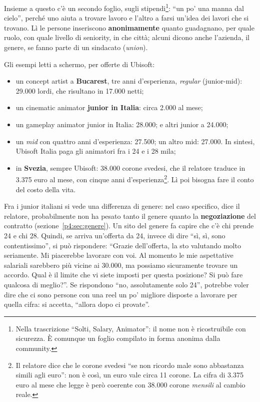 Insieme a questo c'è un secondo foglio, sugli stipendi\footnote{Nella
trascrizione ``Solti, Salary, Animator'': il nome non è ricostruibile con
sicurezza. È comunque un foglio compilato in forma anonima dalla community.}:
``un po' una manna dal cielo'', perché uno aiuta a trovare lavoro e l'altro a
farsi un'idea dei lavori che si trovano. Lì le persone inseriscono
\textbf{anonimamente} quanto guadagnano, per quale ruolo, con quale livello di
seniority, in che città; alcuni dicono anche l'azienda, il genere, se fanno
parte di un sindacato (\emph{union}).

Gli esempi letti a schermo, per offerte di Ubisoft:
\begin{itemize}
  \item un concept artist a \textbf{Bucarest}, tre anni d'esperienza,
        \emph{regular} (junior-mid): 29.000 lordi, che risultano in 17.000
        netti;
  \item un cinematic animator \textbf{junior in Italia}: circa 2.000 al
        mese;
  \item un gameplay animator junior in Italia: 28.000; e altri junior a
        24.000;
  \item un \emph{mid} con quattro anni d'esperienza: 27.500; un altro mid:
        27.000. In sintesi, Ubisoft Italia paga gli animatori fra i 24 e i
        28 mila;
  \item in \textbf{Svezia}, sempre Ubisoft: 38.000 corone svedesi, che il
        relatore traduce in 3.375 euro al mese, con cinque anni
        d'esperienza\footnote{Il relatore dice che le corone svedesi ``se non
        ricordo male sono abbastanza simili agli euro'': non è così, un euro
        vale circa 11 corone. La cifra di 3.375 euro al mese che legge è però
        coerente con 38.000 corone \emph{mensili} al cambio reale.}. Lì poi
        bisogna fare il conto del costo della vita.
\end{itemize}

Fra i junior italiani si vede una differenza di genere: nel caso specifico,
dice il relatore, probabilmente non ha pesato tanto il genere quanto la
\textbf{negoziazione} del contratto (sezione~\ref{p4:sec:genere}). Un sito del
genere fa capire che c'è chi prende 24 e chi 28. Quindi, se arriva un'offerta
da 24, invece di dire ``sì, sì, sono contentissimo'', si può rispondere:
``Grazie dell'offerta, la sto valutando molto seriamente. Mi piacerebbe
lavorare con voi. Al momento le mie aspettative salariali sarebbero più
vicine ai 30.000, ma possiamo sicuramente trovare un accordo. Qual è il limite
che vi siete imposti per questa posizione? Si può fare qualcosa di meglio?''.
Se rispondono ``no, assolutamente solo 24'', potrebbe voler dire che ci sono
persone con una reel un po' migliore disposte a lavorare per quella cifra: si
accetta, ``allora dopo ci provate''.

